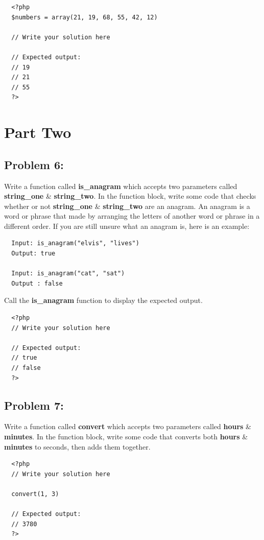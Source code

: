 \documentclass{article}
\begin{document}
\begin{verbatim}
  <?php  
  $numbers = array(21, 19, 68, 55, 42, 12) 
  
  // Write your solution here

  // Expected output:
  // 19
  // 21
  // 55
  ?>
\end{verbatim}

\section*{Part Two}

\subsection*{Problem 6:}
Write a function called \textbf{is\_anagram} which accepts two parameters called \textbf{string\_one} \& \textbf{string\_two}. In the function block, write some code that checks whether or not \textbf{string\_one} \& \textbf{string\_two} are an anagram. An anagram is a word or phrase that made by arranging the letters of another word or phrase in a different order. If you are still unsure what an anagram is, here is an example:

\begin{verbatim}
  Input: is_anagram("elvis", "lives")
  Output: true

  Input: is_anagram("cat", "sat")
  Output : false
\end{verbatim}

Call the \textbf{is\_anagram} function to display the expected output.

\begin{verbatim}
  <?php  
  // Write your solution here

  // Expected output:
  // true
  // false
  ?>
\end{verbatim}

\subsection*{Problem 7:}
Write a function called \textbf{convert} which accepts two parameters called \textbf{hours} \& \textbf{minutes}. In the function block, write some code that converts both \textbf{hours} \& \textbf{minutes} to seconds, then adds them together.

\begin{verbatim}
  <?php  
  // Write your solution here

  convert(1, 3)

  // Expected output:
  // 3780
  ?>
\end{verbatim}
\end{document}
